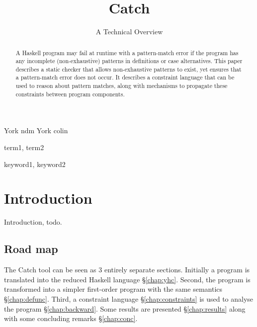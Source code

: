 \documentclass[preprint]{sigplanconf}
\begin{document}
\copyrightdata{[to be supplied]}


\title{Catch}
\subtitle{A Technical Overview}

           {York}
           {ndm}
           {York}
           {colin}

\maketitle

\begin{abstract}
A Haskell program may fail at runtime with a pattern-match error if the program
has any incomplete (non-exhaustive) patterns in definitions or case
alternatives. This paper describes a static checker that allows non-exhaustive
patterns to exist, yet ensures that a pattern-match error does not occur. It
describes a constraint language that can be used to reason about pattern
matches, along with mechanisms to propagate these constraints between program
components.
\end{abstract}


\terms
term1, term2

\keywords
keyword1, keyword2

\section{Introduction}

Introduction, todo.

\subsection{Road map}

The Catch tool can be seen as 3 entirely separate sections. Initially a program
is translated into the reduced Haskell language \S\ref{chap:yhc}. Second, the
program is transformed into a simpler first-order program with the same
semantics \S\ref{chap:defunc}. Third, a constraint language
\S\ref{chap:constraints} is used to analyse the program \S\ref{chap:backward}.
Some results are presented \S\ref{chap:results} along with some concluding
remarks \S\ref{chap:conc}.
\end{document}
